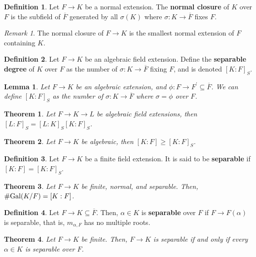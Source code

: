 \documentclass[
    parskip=half,
    toc=flat,
    toc=sectionentrydotfill,
]{scrartcl}  %
\theoremstyle{definition}
\newtheorem{definition}{Definition}[section]
\theoremstyle{plain}
\newtheorem{theorem}{Theorem}[section]
\newtheorem{lemma}{Lemma}[section]
\theoremstyle{remark}
\newtheorem{remark}{Remark}[section]
\begin{document}
\begin{definition}
    Let $F\to K$ be a normal extension.
    The \textbf{normal closure} of $K$ over $F$ is the subfield of $\overline{F}$ generated by all
    $\sigma(K)$ where $\sigma:K\to\overline{F}$ fixes $F$.
\end{definition}

\begin{remark}
    The normal closure of $F\to K$ is the smallest normal extension of $F$ containing $K$.
\end{remark}

\begin{definition}
    Let $F\to K$ be an algebraic field extension.
    Define the \textbf{separable degree} of $K$ over $F$ as the number of $\sigma:K\to\overline{F}$
    fixing $F$, and is denoted $[K:F]_S$.
\end{definition}

\begin{lemma}
    Let $F\to K$ be an algebraic extension, and $\phi:F\to F^\prime\subseteq\overline{F}$.
    We can define $[K:F]_S$ as the number of $\sigma:K\to\overline{F}$ where $\sigma=\phi$ over $F$.
\end{lemma}

\begin{theorem}
    Let $F\to K\to L$ be algebraic field extensions, then $[L:F]_S=[L:K]_S[K:F]_S$.
\end{theorem}

\begin{theorem}
    Let $F\to K$ be algebraic, then $[K:F]\geq [K:F]_S$.
\end{theorem}

\begin{definition}
    Let $F\to K$ be a finite field extension.
    It is said to be \textbf{separable} if $[K:F]=[K:F]_S$.
\end{definition}

\begin{theorem}
    Let $F\to K$ be finite, normal, and separable.
    Then, $\#\textup{Gal}(K/F)=[K:F]$.
\end{theorem}

\begin{definition}
    Let $F\to K\subseteq\overline{F}$.
    Then, $\alpha\in K$ is \textbf{separable} over $F$ if $F\to F(\alpha)$ is separable, that is,
    $m_{\alpha,F}$ has no multiple roots.
\end{definition}

\begin{theorem}
    Let $F\to K$ be finite.
    Then, $F\to K$ is separable if and only if every $\alpha\in K$ is separable over $F$.
\end{theorem}
\end{document}

